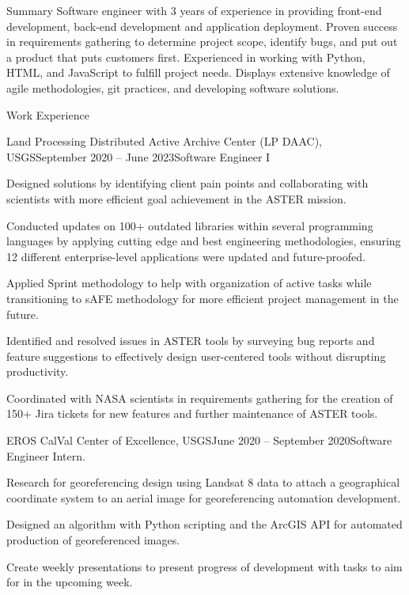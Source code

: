 \documentclass[11pt, a4paper]{resume}
\begin{document}
\begin{rSection}{Summary}
{\normalfont Software engineer with 3 years of experience in providing front-end development, back-end development and application deployment. Proven success in requirements gathering to determine project scope, identify bugs, and put out a product that puts customers first. Experienced in working with Python, HTML, and JavaScript to fulfill project needs. Displays extensive knowledge of agile methodologies, git practices, and developing software solutions.}
\end{rSection}


\begin{rSection}{Work Experience}
\begin{rSubsection}{Land Processing Distributed Active Archive Center (LP DAAC), USGS}{\normalfont September 2020 -- June 2023}{Software Engineer I}{}
 \item {\normalfont Designed solutions by identifying client pain points and collaborating with scientists with more efficient goal achievement in the ASTER mission.}
  \item {\normalfont Conducted updates on 100+ outdated libraries within several programming languages by applying cutting edge and best engineering methodologies, ensuring 12 different enterprise-level applications were updated and future-proofed.}
 \item {\normalfont Applied Sprint methodology to help with organization of active tasks while transitioning to sAFE methodology for more efficient project management in the future.}
 \item {\normalfont Identified and resolved issues in ASTER tools by surveying bug reports and feature suggestions to effectively design user-centered tools without disrupting productivity.}
 \item {\normalfont Coordinated with NASA scientists in requirements gathering for the creation of 150+ Jira tickets for new features and further maintenance of ASTER tools.}
\end{rSubsection}
\begin{rSubsection}{EROS CalVal Center of Excellence, USGS}{\normalfont June 2020 -- September 2020}{Software Engineer Intern.}{}
 \item {\normalfont Research for georeferencing design using Landsat 8 data to attach a geographical coordinate system to an aerial image for georeferencing automation development.}
 \item {\normalfont Designed an algorithm with Python scripting and the ArcGIS API for automated production of georeferenced images.}
  \item {\normalfont Create weekly presentations to present progress of development with tasks to aim for in the upcoming week.}
\end{rSubsection}

\end{rSection}
\end{document}
